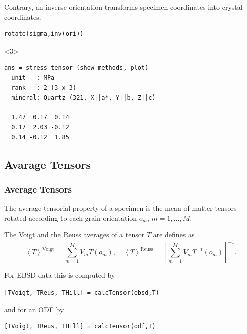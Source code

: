 \documentclass[compress]{beamer}
\begin{document}
\begin{frame}[fragile]
\begin{overlayarea}{\textwidth}{\textheight}
\pause
\medskip

Contrary, an inverse orientation transforms specimen coordinates into crystal
coordinates.
\vspace{-0.2cm}
  \begin{lstlisting}[style=input]
rotate(sigma,inv(ori))
  \end{lstlisting}
\begin{onlyenv}<3>
  \vspace{-.3cm}
  \begin{lstlisting}[style=output]
ans = stress tensor (show methods, plot)
  unit   : MPa
  rank   : 2 (3 x 3)
  mineral: Quartz (321, X||a*, Y||b, Z||c)

  1.47  0.17  0.14
  0.17  2.03 -0.12
  0.14 -0.12  1.85
\end{lstlisting}
\end{onlyenv}
\end{overlayarea}
\end{frame}

\subsection*{Avarage Tensors}

\begin{frame}[fragile]
  \frametitle{Average Tensors}

  The average tensorial property of a specimen is the mean of matter tensors
  rotated according to each grain orientation $o_{m}$, $m=1,\ldots,M$.

\medskip
\pause

The Voigt and the Reuss averages of a tensor $T$ are defines as
\begin{equation*}
  \left<T\right>^{\text{Voigt}}
  = \sum_{m=1}^{M} V_{m} T(o_{m}), \quad
  \left<T\right>^{\text{Reuss}}
  = \left[ \sum_{m=1}^{M} V_{m} T^{-1}(o_{m}) \right]^{-1}.
\end{equation*}

\medskip
\pause

For EBSD data this is computed by
\begin{lstlisting}[style=input]
[TVoigt, TReus, THill] = calcTensor(ebsd,T)
\end{lstlisting}

\medskip
\pause

and for an ODF by
\begin{lstlisting}[style=input]
[TVoigt, TReus, THill] = calcTensor(odf,T)
\end{lstlisting}

\end{frame}
\end{document}
